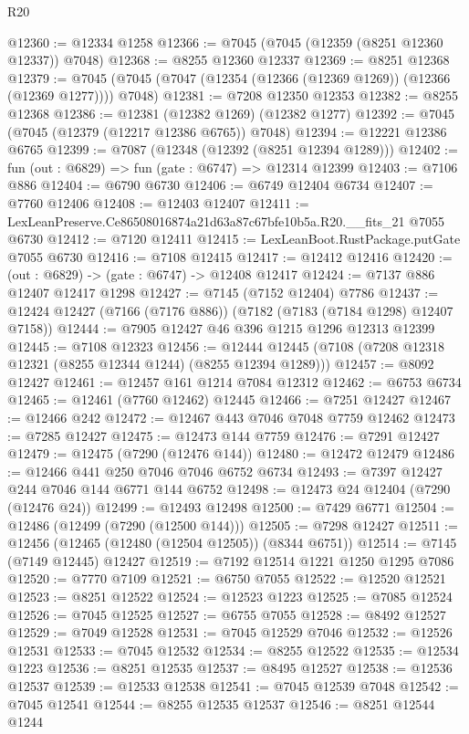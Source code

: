\begin{lexlean}{R20}
\begin{coremodule}
{@12360 := @12334 @1258
@12366 := @7045 (@7045 (@12359 (@8251 @12360 @12337)) @7048)
@12368 := @8255 @12360 @12337
@12369 := @8251 @12368
@12379 := @7045 (@7045 (@7047 (@12354 (@12366 (@12369 @1269)) (@12366 (@12369 @1277)))) @7048)
@12381 := @7208 @12350 @12353
@12382 := @8255 @12368
@12386 := @12381 (@12382 @1269) (@12382 @1277)
@12392 := @7045 (@7045 (@12379 (@12217 @12386 @6765)) @7048)
@12394 := @12221 @12386 @6765
@12399 := @7087 (@12348 (@12392 (@8251 @12394 @1289)))
@12402 := fun (out : @6829) => fun (gate : @6747) => @12314 @12399
@12403 := @7106 @886
@12404 := @6790 @6730
@12406 := @6749 @12404 @6734
@12407 := @7760 @12406
@12408 := @12403 @12407
@12411 := LexLeanPreserve.Ce86508016874a21d63a87c67bfe10b5a.R20.__fits_21 @7055 @6730
@12412 := @7120 @12411
@12415 := LexLeanBoot.RustPackage.putGate @7055 @6730
@12416 := @7108 @12415
@12417 := @12412 @12416
@12420 := (out : @6829) -> (gate : @6747) -> @12408 @12417
@12424 := @7137 @886 @12407 @12417 @1298
@12427 := @7145 (@7152 @12404) @7786
@12437 := @12424 @12427 (@7166 (@7176 @886)) (@7182 (@7183 (@7184 @1298) @12407 @7158))
@12444 := @7905 @12427 @46 @396 @1215 @1296 @12313 @12399
@12445 := @7108 @12323
@12456 := @12444 @12445 (@7108 (@7208 @12318 @12321 (@8255 @12344 @1244) (@8255 @12394 @1289)))
@12457 := @8092 @12427
@12461 := @12457 @161 @1214 @7084 @12312
@12462 := @6753 @6734
@12465 := @12461 (@7760 @12462) @12445
@12466 := @7251 @12427
@12467 := @12466 @242
@12472 := @12467 @443 @7046 @7048 @7759 @12462
@12473 := @7285 @12427
@12475 := @12473 @144 @7759
@12476 := @7291 @12427
@12479 := @12475 (@7290 (@12476 @144))
@12480 := @12472 @12479
@12486 := @12466 @441 @250 @7046 @7046 @6752 @6734
@12493 := @7397 @12427 @244 @7046 @144 @6771 @144 @6752
@12498 := @12473 @24 @12404 (@7290 (@12476 @24))
@12499 := @12493 @12498
@12500 := @7429 @6771
@12504 := @12486 (@12499 (@7290 (@12500 @144)))
@12505 := @7298 @12427
@12511 := @12456 (@12465 (@12480 (@12504 @12505)) (@8344 @6751))
@12514 := @7145 (@7149 @12445) @12427
@12519 := @7192 @12514 @1221 @1250 @1295 @7086
@12520 := @7770 @7109
@12521 := @6750 @7055
@12522 := @12520 @12521
@12523 := @8251 @12522
@12524 := @12523 @1223
@12525 := @7085 @12524
@12526 := @7045 @12525
@12527 := @6755 @7055
@12528 := @8492 @12527
@12529 := @7049 @12528
@12531 := @7045 @12529 @7046
@12532 := @12526 @12531
@12533 := @7045 @12532
@12534 := @8255 @12522
@12535 := @12534 @1223
@12536 := @8251 @12535
@12537 := @8495 @12527
@12538 := @12536 @12537
@12539 := @12533 @12538
@12541 := @7045 @12539 @7048
@12542 := @7045 @12541
@12544 := @8255 @12535 @12537
@12546 := @8251 @12544 @1244
}
\end{coremodule}
\end{lexlean}
